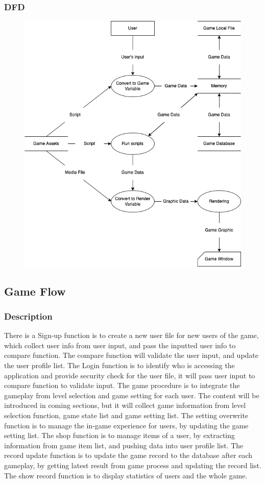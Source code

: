 \documentclass{article}
\begin{document}
\subsubsection{DFD}
\begin{figure}[H]
    \centering
    \includegraphics*[scale=0.4]{Master_DFD.png}
\end{figure}
\subsection{Game Flow}
\subsubsection{Description}
\par There is a Sign-up function is to create a new user file for new users of the game, which collect user info from user input, and pass the inputted user info to compare function. The compare function will validate the user input, and update the user profile list. The Login function is to identify who is accessing the application and provide security check for the user file, it will pass user input to compare function to validate input. The game procedure is to integrate the gameplay from level selection and game setting for each user. The content will be introduced in coming sections, but it will collect game information from level selection function, game state list and game setting list. The setting overwrite function is to manage the in-game experience for users, by updating the game setting list. The shop function is to manage items of a user, by extracting information from game item list, and pushing data into user profile list. The record update function is to update the game record to the database after each gameplay, by getting latest result from game process and updating the record list. The show record function is to display statistics of users and the whole game.
\end{document}
